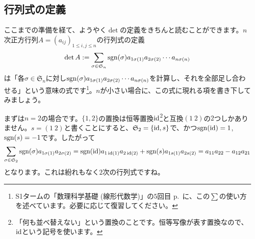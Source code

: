 \subsection{行列式の定義}
ここまでの準備を経て、ようやく$\det$の定義をきちんと読むことができます。$n$次正方行列$A = (a_{ij})_{1 \leq i,j \leq n}$の行列式の定義
\[
\det A := \sum_{\sigma \in \mathfrak{S}_n} \operatorname{sgn}(\sigma) a_{1 \sigma(1)} a_{2 \sigma(2)} \cdots a_{n \sigma(n)}
\]
は「各$\sigma \in \mathfrak{S}_n$に対し$\operatorname{sgn}(\sigma) a_{1 \sigma(1)} a_{2 \sigma(2)} \cdots a_{n \sigma(n)}$を計算し、それを全部足し合わせる」という意味の式です\footnote{S1タームの「数理科学基礎 (線形代数学)」の$5$回目 p.~\pageref{section:usage_of_sum_symbol}に、この$\sum$の使い方を述べています。必要に応じて復習してください。}。$n$が小さい場合に、この式に現れる項を書き下してみましょう。

まずは$n = 2$の場合です。$\{1, 2\}$の置換は恒等置換$\operatorname{id}$\footnote{「何も並べ替えない」という置換のことです。恒等写像が表す置換なので、$\operatorname{id}$という記号を使います。}と互換$(1\ 2)$の$2$つしかありません。$s = (1 \ 2)$と書くことにすると、$\mathfrak{S}_2 = \{\operatorname{id}, s\}$で、かつ$\operatorname{sgn}(\operatorname{id}) = 1$, $\operatorname{sgn}(s) = -1$です。したがって
\[
\sum_{\sigma \in \mathfrak{S}_2} \operatorname{sgn}(\sigma) a_{1 \sigma(1)} a_{2 \sigma(2)}
= \operatorname{sgn}(\operatorname{id}) a_{1 \operatorname{id}(1)} a_{2 \operatorname{id}(2)} + \operatorname{sgn}(s) a_{1 s(1)} a_{2 s(2)} = a_{11} a_{22} - a_{12} a_{21}
\]
となります。これは紛れもなく$2$次の行列式ですね。

